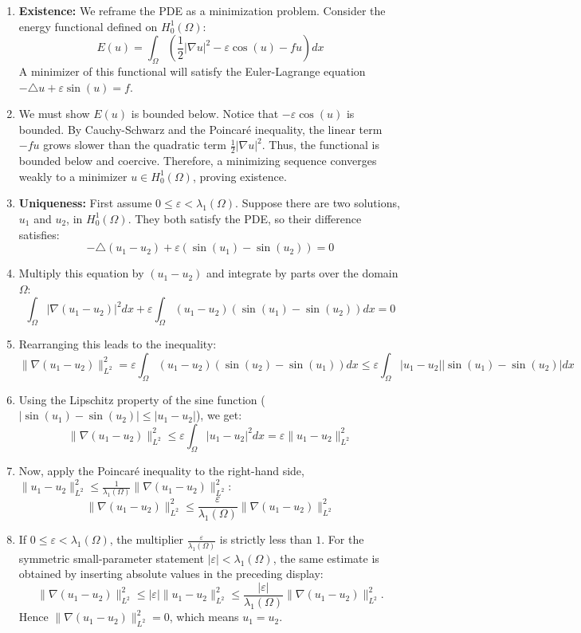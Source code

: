 \begin{solution}
\begin{enumerate}
    \item \textbf{Existence:} We reframe the PDE as a minimization problem. Consider the energy functional defined on $H_0^1(\Omega)$:
       \[
       E(u) = \int_\Omega \left( \frac{1}{2}|\nabla u|^2 - \varepsilon\cos(u) - fu \right) dx
       \]
       A minimizer of this functional will satisfy the Euler-Lagrange equation $-\triangle u + \varepsilon\sin(u) = f$.
    \item We must show $E(u)$ is bounded below. Notice that $-\varepsilon\cos(u)$ is bounded. By Cauchy-Schwarz and the Poincaré inequality, the linear term $-fu$ grows slower than the quadratic term $\frac{1}{2}|\nabla u|^2$. Thus, the functional is bounded below and coercive. Therefore, a minimizing sequence converges weakly to a minimizer $u \in H_0^1(\Omega)$, proving existence.
    \item \textbf{Uniqueness:} First assume $0\leq\varepsilon<\lambda_1(\Omega)$. Suppose there are two solutions, $u_1$ and $u_2$, in $H_0^1(\Omega)$. They both satisfy the PDE, so their difference satisfies:
       \[
       -\triangle(u_1 - u_2) + \varepsilon(\sin(u_1) - \sin(u_2)) = 0
       \]
    \item Multiply this equation by $(u_1 - u_2)$ and integrate by parts over the domain $\Omega$:
       \[
       \int_\Omega |\nabla(u_1 - u_2)|^2 dx + \varepsilon \int_\Omega (u_1 - u_2)(\sin(u_1) - \sin(u_2)) dx = 0
       \]
    \item Rearranging this leads to the inequality:
       \[
       \|\nabla(u_1 - u_2)\|_{L^2}^2 = \varepsilon \int_\Omega (u_1 - u_2)(\sin(u_2) - \sin(u_1)) dx \leq \varepsilon \int_\Omega |u_1 - u_2||\sin(u_1) - \sin(u_2)| dx
       \]
    \item Using the Lipschitz property of the sine function ($|\sin(u_1) - \sin(u_2)| \leq |u_1 - u_2|$), we get:
       \[
       \|\nabla(u_1 - u_2)\|_{L^2}^2 \leq \varepsilon \int_\Omega |u_1 - u_2|^2 dx = \varepsilon \|u_1 - u_2\|_{L^2}^2
       \]
    \item Now, apply the Poincaré inequality to the right-hand side, $\|u_1 - u_2\|_{L^2}^2 \leq \frac{1}{\lambda_1(\Omega)} \|\nabla(u_1 - u_2)\|_{L^2}^2$:
       \[
       \|\nabla(u_1 - u_2)\|_{L^2}^2 \leq \frac{\varepsilon}{\lambda_1(\Omega)} \|\nabla(u_1 - u_2)\|_{L^2}^2
       \]
    \item If $0\leq\varepsilon<\lambda_1(\Omega)$, the multiplier $\frac{\varepsilon}{\lambda_1(\Omega)}$ is strictly less than $1$. For the symmetric small-parameter statement $|\varepsilon|<\lambda_1(\Omega)$, the same estimate is obtained by inserting absolute values in the preceding display:
       \[
       \|\nabla(u_1-u_2)\|_{L^2}^2
       \leq |\varepsilon|\|u_1-u_2\|_{L^2}^2
       \leq \frac{|\varepsilon|}{\lambda_1(\Omega)}
       \|\nabla(u_1-u_2)\|_{L^2}^2.
       \]
       Hence $\|\nabla(u_1 - u_2)\|_{L^2}^2 = 0$, which means $u_1 = u_2$.
\end{enumerate}


\end{solution}
